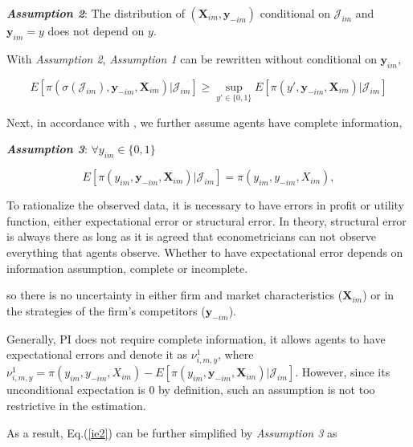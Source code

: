 \documentclass[a4paper]{article}
\begin{document}
\bigskip

\textbf{\textit{Assumption 2}}: The distribution of $(\textbf{X}_{im},\textbf{y}_{-im})$ conditional on $\mathcal{J}_{im}$ and $\textbf{y}_{im}=y$ does not depend on $y$.

\bigskip

With \textit{Assumption 2}, \textit{Assumption 1} can be rewritten without conditional on $\textbf{y}_{im}$,

\begin{equation}
E[\pi(\sigma(\mathcal{J}_{im}),\textbf{y}_{-im},\textbf{X}_{im})|\mathcal{J}_{im}]\geq \sup_{y'\in \{0,1\}} E[\pi(y',\textbf{y}_{-im},\textbf{X}_{im})|\mathcal{J}_{im}]
\label{ie2}
\end{equation}
 
Next, in accordance with \cite{ciliberto2009market}, we further assume agents have complete information,

\bigskip

\textbf{\textit{Assumption 3}}: $\forall y_{im} \in \{0,1\}$

$$E[\pi(y_{im},\textbf{y}_{-im},\textbf{X}_{im})|\mathcal{J}_{im}]=\pi(y_{im},y_{-im},X_{im}),$$


\bigskip

{\color{DarkOliveGreen}

To rationalize the observed data, it is necessary to have errors in profit or utility function, either expectational error or structural error. In theory, structural error is always there as long as it is agreed that econometricians can not observe everything that agents observe. Whether to have expectational error depends on information assumption, complete or incomplete. 

}

\bigskip

so there is no uncertainty in either firm and market characteristics ($\textbf{X}_{im}$) or in the strategies of the firm's competitors ($\textbf{y}_{-im}$). 

Generally, PI does not require complete information, it allows agents to have expectational errors and denote it as $\nu^1_{i,m,y}$, where $\nu^1_{i,m,y}=\pi(y_{im},y_{-im},X_{im})-E[\pi(y_{im},\textbf{y}_{-im},\textbf{X}_{im})|\mathcal{J}_{im}]$. However, since its unconditional expectation is 0 by definition, such an assumption is not too restrictive in the estimation. 


As a result, Eq.(\ref{ie2}) can be further simplified by \textit{Assumption 3} as 
\end{document}
